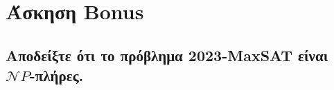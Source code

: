 \section{Άσκηση Bonus}
\subsection{Αποδείξτε ότι το πρόβλημα 2023-MaxSAT είναι $\mathcal{N}P$-πλήρες.}